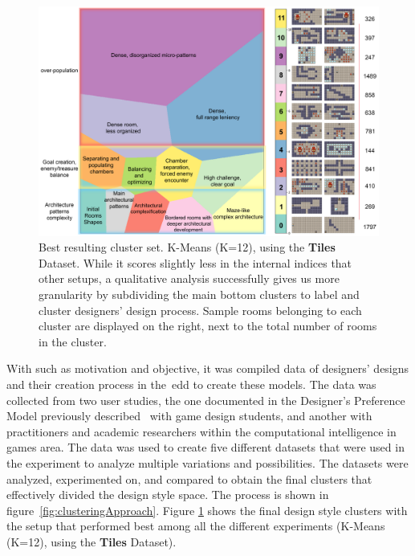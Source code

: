 \begin{figure}[t]
\centerline{\includegraphics[width=\textwidth]{figures/DesPersonas-figs/final-cluster.png}}
\caption{Best resulting cluster set. K-Means (K=12), using the \textbf{Tiles} Dataset. While it scores slightly less in the internal indices that other setups, a qualitative analysis successfully gives us more granularity by subdividing the main bottom clusters to label and cluster designers' design process. Sample rooms belonging to each cluster are displayed on the right, next to the total number of rooms in the cluster.} \label{fig:all-clusters}
\end{figure}

With such as motivation and objective, it was compiled data of designers' designs and their creation process in the~\acrshort{edd} to create these models. The data was collected from two user studies, the one documented in the Designer's Preference Model previously described~\cite{Alvarez2020-DesignerPreference} with game design students, and another with practitioners and academic researchers within the computational intelligence in games area. The data was used to create five different datasets that were used in the experiment to analyze multiple variations and possibilities. The datasets were analyzed, experimented on, and compared to obtain the final clusters that effectively divided the design style space. The process is shown in figure~\ref{fig:clusteringApproach}. Figure \ref{fig:all-clusters} shows the final design style clusters with the setup that performed best among all the different experiments (K-Means (K=12), using the \textbf{Tiles} Dataset).

